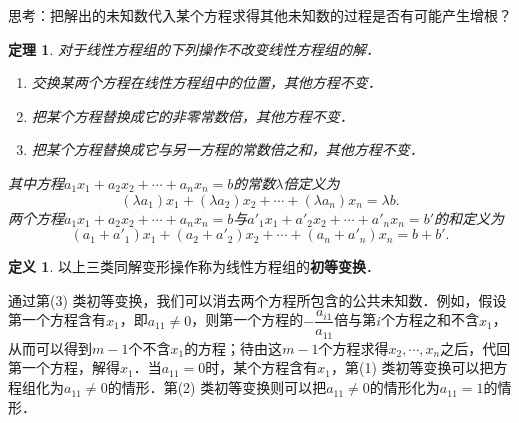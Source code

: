 \documentclass[a4paper,fontset=windows]{ctexbook}
\newtheorem{theorem}{定理}[chapter]
\theoremstyle{definition}
\newtheorem{definition}{定义}[chapter]
\def\note{\noindent\raisebox{10pt}{\dbend}\hspace{7pt}}
\begin{document}
\note 思考：把解出的未知数代入某个方程求得其他未知数的过程是否有可能产生增根？

\begin{theorem}\label{thm1.1}
对于线性方程组的下列操作不改变线性方程组的解．
\begin{enumerate}
\item 交换某两个方程在线性方程组中的位置，其他方程不变．
\item 把某个方程替换成它的非零常数倍，其他方程不变．
\item 把某个方程替换成它与另一方程的常数倍之和，其他方程不变．
\end{enumerate}
其中方程$a_1x_1+a_2x_2+\cdots+a_nx_n=b$的常数$\lambda$倍定义为
$$(\lambda a_1)x_1+(\lambda a_2)x_2+\cdots+(\lambda a_n)x_n=\lambda b.$$
两个方程$a_1x_1+a_2x_2+\cdots+a_nx_n=b$与$a'_1x_1+a'_2x_2+\cdots+a'_nx_n=b'$的和定义为
$$(a_1+a'_1)x_1+(a_2+a'_2)x_2+\cdots+(a_n+a'_n)x_n=b+b'.$$
\end{theorem}

\begin{definition}
以上三类同解变形操作称为线性方程组的{\bf 初等变换}．
\end{definition}

通过第(3) 类初等变换，我们可以消去两个方程所包含的公共未知数．例如，假设第一个方程含有$x_1$，即$a_{11}\ne 0$，则第一个方程的$-\dfrac{a_{i1}}{a_{11}}$倍与第$i$个方程之和不含$x_1$，从而可以得到$m-1$个不含$x_1$的方程；待由这$m-1$个方程求得$x_2,\cdots,x_n$之后，代回第一个方程，解得$x_1$．当$a_{11}=0$时，某个方程含有$x_1$，第(1) 类初等变换可以把方程组化为$a_{11}\ne 0$的情形．第(2) 类初等变换则可以把$a_{11}\ne 0$的情形化为$a_{11}=1$的情形．
\end{document}
